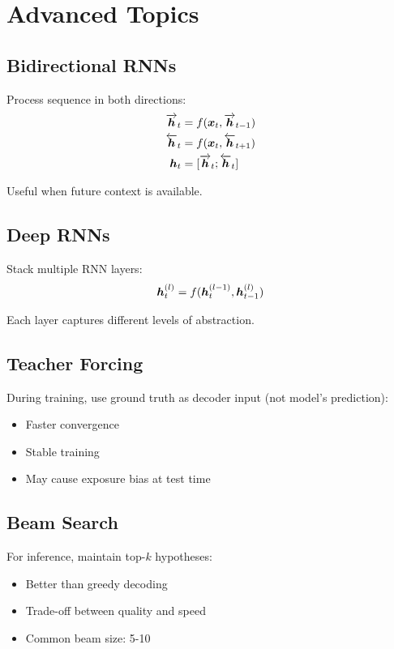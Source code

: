 
\section{Advanced Topics}
\label{sec:rnn-advanced}

\subsection{Bidirectional RNNs}

Process sequence in both directions:
\begin{align}
\overrightarrow{\boldsymbol{h}}_t &= f(\boldsymbol{x}_t, \overrightarrow{\boldsymbol{h}}_{t-1}) \\
\overleftarrow{\boldsymbol{h}}_t &= f(\boldsymbol{x}_t, \overleftarrow{\boldsymbol{h}}_{t+1}) \\
\boldsymbol{h}_t &= [\overrightarrow{\boldsymbol{h}}_t; \overleftarrow{\boldsymbol{h}}_t]
\end{align}

Useful when future context is available.

\subsection{Deep RNNs}

Stack multiple RNN layers:
\begin{equation}
\boldsymbol{h}_t^{(l)} = f(\boldsymbol{h}_t^{(l-1)}, \boldsymbol{h}_{t-1}^{(l)})
\end{equation}

Each layer captures different levels of abstraction.

\subsection{Teacher Forcing}

During training, use ground truth as decoder input (not model's prediction):
\begin{itemize}
    \item Faster convergence
    \item Stable training
    \item May cause exposure bias at test time
\end{itemize}

\subsection{Beam Search}

For inference, maintain top-$k$ hypotheses:
\begin{itemize}
    \item Better than greedy decoding
    \item Trade-off between quality and speed
    \item Common beam size: 5-10
\end{itemize}
